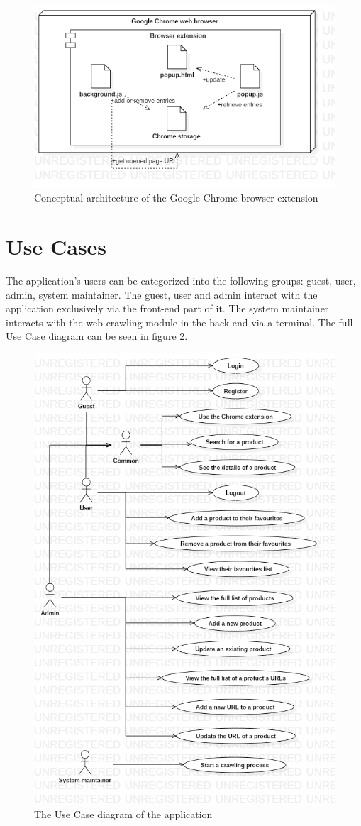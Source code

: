 \documentclass[12pt,a4paper,twoside]{report}
\begin{document}
\begin{figure}[ht]
  \centering
  \includegraphics[width=0.65\linewidth]{img/app_conceptual_architecture_chrome_extension.png}
  \caption[]{Conceptual architecture of the Google Chrome browser extension}
  \label{fig:app_conceptual_architecture_chrome_extension}
\end{figure}


\section{Use Cases}

The application's users can be categorized into the following groups: guest, user, admin, system maintainer. The guest, user and admin interact with the application exclusively via the front-end part of it. The system maintainer interacts with the web crawling module in the back-end via a terminal. The full Use Case diagram can be seen in figure \ref{fig:app_use_case}.

\begin{figure}[ht]
  \centering
  \includegraphics[width=0.5\linewidth]{img/app_use_case.png}
  \caption[]{The Use Case diagram of the application}
  \label{fig:app_use_case}
\end{figure}
\end{document}
